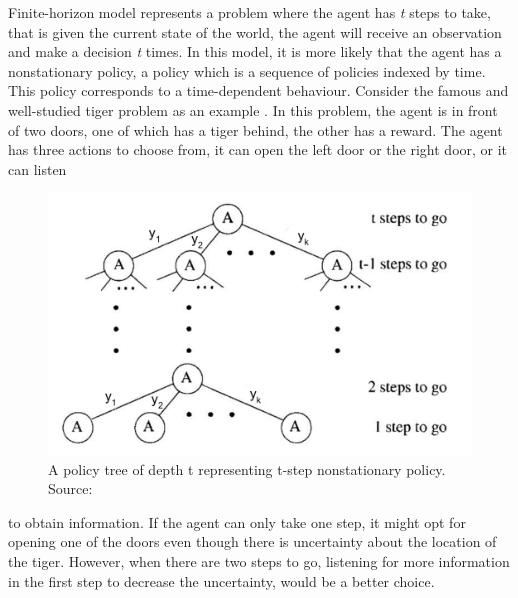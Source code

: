 Finite-horizon model represents a problem where the agent has \textit{t} steps to take, that is given the current state of the world, the agent will receive an observation and make a decision \textit{t} times. In this model, it is more likely that the agent has a nonstationary policy, a policy which is a sequence of policies indexed by time. This policy corresponds to a time-dependent behaviour. Consider the famous and well-studied tiger problem as an example \cite{KAELBLING199899, nair2003}. In this problem, the agent is in front of two doors, one of which has a tiger behind, the other has a reward. The agent has three actions to choose from, it can open the left door or the right door, or it can listen 
\begin{figure}
	\begin{center}
		\includegraphics[width=1\linewidth]{figures/policy_tree}
		\caption[A policy tree representing nonstationary policy of POMDP]{A policy tree of depth t representing t-step nonstationary policy. Source: \cite{KAELBLING199899}}
		\label{fig:policy_tree}
	\end{center}
	\vspace{-40pt}
\end{figure}
to obtain information. If the agent can only take one step, it might opt for opening one of the doors even though there is uncertainty about the location of the tiger. However, when there are two steps to go, listening for more information in the first step to decrease the uncertainty, would be a better choice.\\
